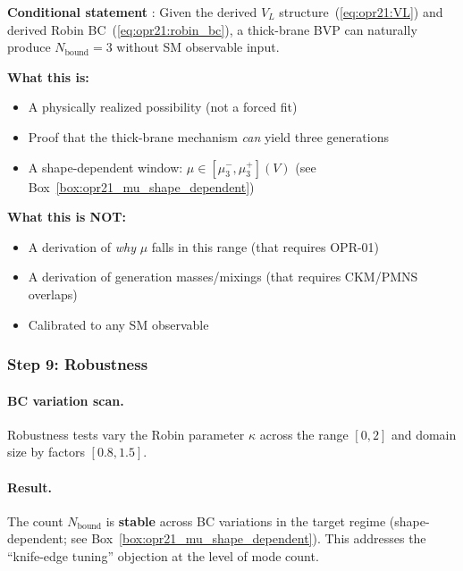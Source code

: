 \begin{tcolorbox}[colback=green!5!white, colframe=green!50!black,
    title=\textbf{Interpretation: Three Generations from Thick-Brane BVP}]
\label{box:opr21_three_gen}

\textbf{Conditional statement} \tagDc{}:
Given the derived $V_L$ structure~(\ref{eq:opr21:VL}) and derived Robin BC~(\ref{eq:opr21:robin_bc}),
a thick-brane BVP can naturally produce $N_{\text{bound}} = 3$ without SM observable input.

\textbf{What this is:}
\begin{itemize}[nosep]
    \item A physically realized possibility (not a forced fit)
    \item Proof that the thick-brane mechanism \emph{can} yield three generations
    \item A shape-dependent window: $\mu \in [\mu_3^-, \mu_3^+](V)$ (see Box~\ref{box:opr21_mu_shape_dependent})
\end{itemize}

\textbf{What this is NOT:}
\begin{itemize}[nosep]
    \item A derivation of \emph{why} $\mu$ falls in this range (that requires OPR-01)
    \item A derivation of generation masses/mixings (that requires CKM/PMNS overlaps)
    \item Calibrated to any SM observable
\end{itemize}
\end{tcolorbox}

\subsubsection{Step 9: Robustness}
\label{subsubsec:opr21_step9}

\paragraph{BC variation scan.}
Robustness tests vary the Robin parameter $\kappa$ across the range $[0, 2]$
and domain size by factors $[0.8, 1.5]$.

\paragraph{Result.}
The count $N_{\text{bound}}$ is \textbf{stable} across BC variations in the
target regime (shape-dependent; see Box~\ref{box:opr21_mu_shape_dependent}).
This addresses the ``knife-edge tuning'' objection at the level of mode count.

